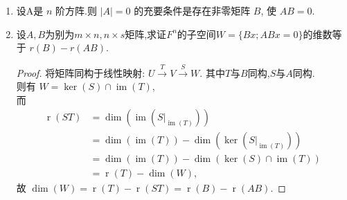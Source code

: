 \begin{enumerate}
    \item 设A是 $n$ 阶方阵.则 $|A|=0$ 的充要条件是存在非零矩阵 $B$, 使 $A B=0$.
    \item 设$A,B$为别为$m \times n, n \times s$矩阵,求证$F^n$的子空间$W=\{Bx;ABx=0\}$的维数等于 $r(B)-r(A B)$.
    \begin{proof}
        将矩阵同构于线性映射: $U \stackrel{T}{\longrightarrow} V \stackrel{S}{\longrightarrow} W$.
    其中$T$与$B$同构,$S$与$A$同构.\\
    则有 $W=\operatorname{ker}(S) \cap \operatorname{im}(T)$,\\
    而$$
    \begin{aligned}
    \operatorname{r}(S T) & =\operatorname{dim}\left(\operatorname{im}\left(S |_{\operatorname{im} {(T)}}\right)\right) \\
    & =\operatorname{dim}(\operatorname{im}(T))-\operatorname{dim}(\operatorname{ker}(S |_{\operatorname{im} (T)})) \\
    & =\operatorname{dim}(\operatorname{im}(T))-\operatorname{dim}(\operatorname{ker}(S) \cap \operatorname{im}(T)) \\
    & =\operatorname{r}(T)-\operatorname{dim}(W),
    \end{aligned}
    $$
    故 $\operatorname{dim}(W)=\operatorname{r}(T)-\operatorname{r}(S T)=\operatorname{r}(B)-\operatorname{r}(A B)$.
    \end{proof}
\end{enumerate}
